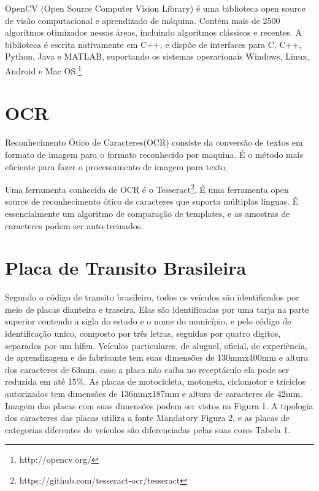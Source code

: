 OpenCV (Open Source Computer Vision Library) é uma biblioteca open source de
visão computacional e aprendizado de máquina. Contém mais de 2500 algoritmos
otimizados nessas áreas, incluindo algoritmos clássicos e recentes. A biblioteca
é escrita nativamente em C++, e dispõe de interfaces para C, C++, Python, Java e
MATLAB, suportando os sistemas operacionais Windows, Linux, Android e Mac
OS.\footnote{http://opencv.org/}

\section{OCR}
\label{sec:ocr}

Reconhecimento Ótico de Caracteres(OCR) consiste da conversão de textos em
formato de imagem para o formato reconhecido por maquina. É o método mais
eficiente para fazer o processamento de imagem para
texto.~\cite{mohit2015designing}

Uma ferramenta conhecida de OCR é o
Tesseract\footnote{https://github.com/tesseract-ocr/tesseract}. É uma ferramenta
open source de reconhecimento ótico de caracteres que suporta múltiplas linguas.
É essencialmente um algoritmo de comparação de templates, e as amostras de
caracteres podem ser auto-treinados.~\cite{ho2016intelligent}

\section{Placa de Transito Brasileira}

Segundo o código de transito brasileiro, todos os veículos são identificados por meio de placas dianteira e traseira. 
Elas são identificadas por uma tarja na parte superior contendo a sigla do estado e o nome do município, e pelo código 
de identificação unico, composto por três letras, seguidas por quatro digitos, separados por um hífen. Veículos particulares,
de aluguel, oficial, de experiência, de aprendizagem e de fabricante tem suas dimensões de 130mmx400mm e altura dos
caracteres de 63mm, caso a placa não caiba no receptáculo ela pode ser reduzida em até 15\%. As placas de motocicleta,
motoneta, ciclomotor e triciclos autorizados tem dimensões de 136mmx187mm e altura de caracteres de 42mm. Imagem das placas
com suas dimensões podem ser vistos na Figura 1. A tipologia dos caracteres das placas utiliza a fonte Mandatory Figura 2,
e as placas de categorias diferentes de veículos são diferenciadas pelas suas cores Tabela 1.

